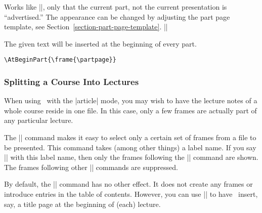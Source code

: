 
\begin{command}{\partpage}
  Works like |\titlepage|, only that the current part, not the current
  presentation is ``advertised.'' The appearance can be changed by
  adjusting the part page template, see
  Section~\ref{section-part-page-template}. 
  \example |\frame{\partpage}|
\end{command}

\begin{command}{\AtBeginPart{}}
  The given text will be inserted at the beginning of every
  part.
  
  \example
\begin{verbatim}
\AtBeginPart{\frame{\partpage}}
\end{verbatim}
\end{command}


\subsubsection{Splitting a Course Into Lectures}

When using \beamer\ with the |article| mode, you may wish to have the
lecture notes of a whole course reside in one file. In this case, only
a few frames are actually part of any particular lecture.

The |\lecture| command makes it easy to select only a certain set of
frames from a file to be presented. This command takes (among other
things) a label name. If you say || with this label
name, then only the frames following the |\lecture| command are
shown. The frames following other |\lecture| commands are suppressed.

By default, the |\lecture| command has no other effect. It does not
create any frames or introduce entries in the table of
contents. However, you can use |\AtBeginLecture| to have \beamer\
insert, say, a title page at the beginning of (each) lecture.

